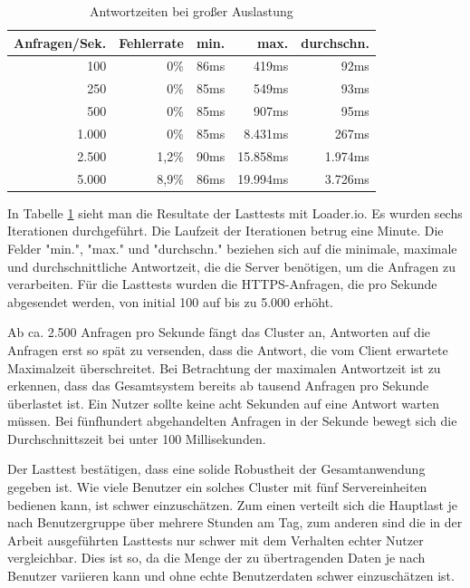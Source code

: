 \begin{table}[h]
\begin{center}
\begin{tabular}{rrrrr}
Anfragen/Sek. & Fehlerrate & min. & max. & durchschn. \\
\hline
100 &  0\% & 86ms & 419ms & 92ms \\
250 &  0\% & 85ms & 549ms & 93ms \\
500 &  0\% & 85ms & 907ms & 95ms \\
1.000 &  0\% & 85ms & 8.431ms & 267ms \\
2.500 &  1,2\% & 90ms & 15.858ms & 1.974ms \\
5.000 &  8,9\% & 86ms & 19.994ms & 3.726ms \\
\end{tabular}
\end{center}
\caption{Antwortzeiten bei großer Auslastung}
\label{tab:resultatdeslasttestsmitloaderio}
\end{table}

In Tabelle \ref{tab:resultatdeslasttestsmitloaderio} sieht man die Resultate
der Lasttests mit Loader.io. Es wurden sechs Iterationen durchgeführt. Die Laufzeit der
Iterationen betrug eine Minute. Die Felder "min.", "max." und "durchschn." beziehen
sich auf die minimale, maximale und durchschnittliche
Antwortzeit, die die Server benötigen, um die
Anfragen zu verarbeiten. Für die Lasttests wurden die HTTPS-Anfragen,
die pro Sekunde abgesendet werden, von initial 100 auf bis zu 5.000 erhöht.

Ab ca. 2.500 Anfragen pro Sekunde fängt das Cluster an, Antworten auf die
Anfragen erst so spät zu versenden, dass die Antwort, die vom Client
erwartete Maximalzeit überschreitet. Bei Betrachtung der maximalen Antwortzeit ist zu
erkennen, dass das Gesamtsystem bereits ab tausend Anfragen pro Sekunde
überlastet ist. Ein Nutzer sollte keine acht Sekunden auf eine Antwort warten
müssen. Bei fünfhundert abgehandelten Anfragen in der Sekunde bewegt sich die Durchschnittszeit
bei unter 100 Millisekunden.

Der Lasttest bestätigen, dass eine solide Robustheit der Gesamtanwendung gegeben ist.
Wie viele Benutzer ein solches Cluster mit fünf Servereinheiten
bedienen kann, ist schwer einzuschätzen. Zum einen verteilt sich die Hauptlast je nach
Benutzergruppe über mehrere Stunden am Tag, zum anderen sind die in der Arbeit ausgeführten
Lasttests nur schwer mit dem Verhalten echter Nutzer vergleichbar. Dies ist so,
da die Menge der zu übertragenden Daten je nach Benutzer variieren kann
und ohne echte Benutzerdaten schwer einzuschätzen ist.
